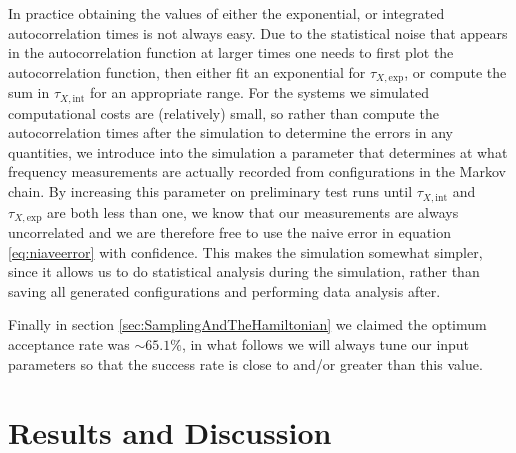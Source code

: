 \documentclass[12pt]{article}
\begin{document}
            In practice obtaining the values of either the exponential, or integrated autocorrelation times is not always easy. Due to the statistical noise that appears in the autocorrelation function at larger times one needs to first plot the autocorrelation function, then either fit an exponential for $\tau_{X,\text{exp}}$, or compute the sum in $\tau_{X,\text{int}}$ for an appropriate range. For the systems we simulated computational costs are (relatively) small, so rather than compute the autocorrelation times after the simulation to determine the errors in any quantities, we introduce into the simulation a parameter that determines at what frequency measurements are actually recorded from configurations in the Markov chain. By increasing this parameter on preliminary test runs until $\tau_{X,\text{int}}$ and $\tau_{X,\text{exp}}$ are both less than one, we know that our measurements are always uncorrelated and we are therefore free to use the naive error in equation \ref{eq:niaveerror} with confidence. This makes the simulation somewhat simpler, since it allows us to do statistical analysis during the simulation, rather than saving all generated configurations and performing data analysis after. 

            Finally in section \ref{sec:SamplingAndTheHamiltonian} we claimed the optimum acceptance rate was $\sim 65.1\%$, in what follows we will always tune our input parameters so that the success rate is close to and/or greater than this value.

            
\section{Results and Discussion}
\end{document}
